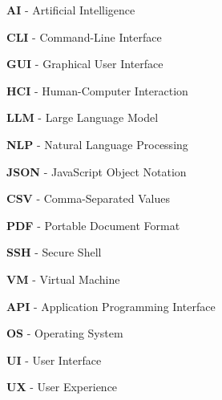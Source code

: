 \textbf{AI} - Artificial Intelligence

\textbf{CLI} - Command-Line Interface

\textbf{GUI} - Graphical User Interface

\textbf{HCI} - Human-Computer Interaction

\textbf{LLM} - Large Language Model

\textbf{NLP} - Natural Language Processing

\textbf{JSON} - JavaScript Object Notation

\textbf{CSV} - Comma-Separated Values

\textbf{PDF} - Portable Document Format

\textbf{SSH} - Secure Shell

\textbf{VM} - Virtual Machine

\textbf{API} - Application Programming Interface

\textbf{OS} - Operating System

\textbf{UI} - User Interface

\textbf{UX} - User Experience

